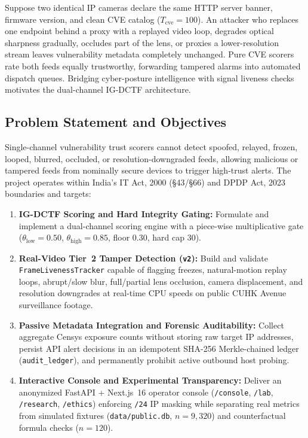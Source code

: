 \documentclass[12pt,a4paper]{article}
\begin{document}
Suppose two identical IP cameras declare the same HTTP server banner, firmware version, and clean CVE catalog ($T_{\mathrm{cve}} = 100$). An attacker who replaces one endpoint behind a proxy with a replayed video loop, degrades optical sharpness gradually, occludes part of the lens, or proxies a lower-resolution stream leaves vulnerability metadata completely unchanged. Pure CVE scorers rate both feeds equally trustworthy, forwarding tampered alarms into automated dispatch queues. Bridging cyber-posture intelligence with signal liveness checks motivates the dual-channel IG-DCTF architecture.

\subsection{Problem Statement and Objectives}
Single-channel vulnerability trust scorers cannot detect spoofed, relayed, frozen, looped, blurred, occluded, or resolution-downgraded feeds, allowing malicious or tampered feeds from nominally secure devices to trigger high-trust alerts. The project operates within India's IT Act, 2000 (\S43/\S66) and DPDP Act, 2023 boundaries and targets:
\begin{enumerate}
  \item \textbf{IG-DCTF Scoring and Hard Integrity Gating:} Formulate and implement a dual-channel scoring engine with a piece-wise multiplicative gate ($\theta_{\mathrm{low}} = 0.50$, $\theta_{\mathrm{high}} = 0.85$, floor $0.30$, hard cap $30$).
  \item \textbf{Real-Video Tier~2 Tamper Detection (\texttt{v2}):} Build and validate \texttt{FrameLivenessTracker} capable of flagging freezes, natural-motion replay loops, abrupt/slow blur, full/partial lens occlusion, camera displacement, and resolution downgrades at real-time CPU speeds on public CUHK Avenue surveillance footage.
  \item \textbf{Passive Metadata Integration and Forensic Auditability:} Collect aggregate Censys exposure counts without storing raw target IP addresses, persist API alert decisions in an idempotent SHA-256 Merkle-chained ledger (\texttt{audit\_ledger}), and permanently prohibit active outbound host probing.
  \item \textbf{Interactive Console and Experimental Transparency:} Deliver an anonymized FastAPI + Next.js~16 operator console (\texttt{/console}, \texttt{/lab}, \texttt{/research}, \texttt{/ethics}) enforcing \texttt{/24} IP masking while separating real metrics from simulated fixtures (\texttt{data/public.db}, $n = 9,320$) and counterfactual formula checks ($n = 120$).
\end{enumerate}
\end{document}
